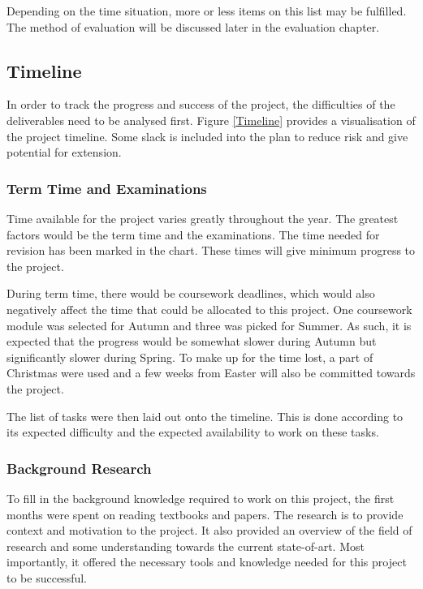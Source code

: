 Depending on the time situation, more or less items on this list may be
fulfilled.
The method of evaluation will be discussed later in the evaluation chapter.

\subsection{Timeline}
\begin{figure*}
  \centering
  
  \caption{Project Timeline}
  \label{Timeline}
\end{figure*}

In order to track the progress and success of the project, the difficulties
of the deliverables need to be analysed first.
Figure \ref{Timeline} provides a visualisation of the project timeline.
Some slack is included into the plan to reduce risk and give potential for
extension.

\subsubsection{\textbf{Term Time and Examinations}}
Time available for the project varies greatly throughout the year.
The greatest factors would be the term time and the examinations.
The time needed for revision has been marked in the chart.
These times will give minimum progress to the project.

During term time, there would be coursework deadlines, which would also
negatively affect the time that could be allocated to this project.
One coursework module was selected for Autumn and three was picked for Summer.
As such, it is expected that the progress would be somewhat slower during Autumn
but significantly slower during Spring.
To make up for the time lost, a part of Christmas were used and a few weeks
from Easter will also be committed towards the project.

The list of tasks were then laid out onto the timeline.
This is done according to its expected difficulty and the expected availability
to work on these tasks.

\subsubsection{\textbf{Background Research}}
To fill in the background knowledge required to work on this project, the first
months were spent on reading textbooks and papers.
The research is to provide context and motivation to the project.
It also provided an overview of the field of research and some understanding
towards the current state-of-art.
Most importantly, it offered the necessary tools and knowledge needed for this
project to be successful.

